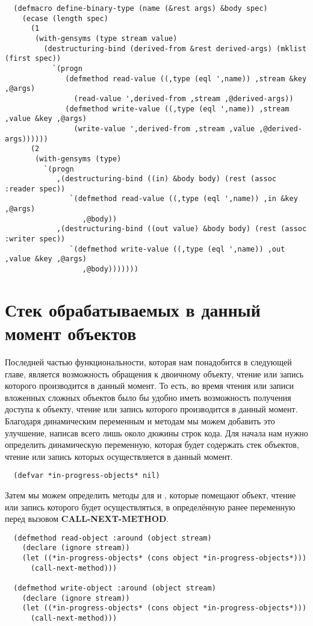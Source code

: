 \begin{lstlisting}
  (defmacro define-binary-type (name (&rest args) &body spec)
    (ecase (length spec)
      (1
       (with-gensyms (type stream value)
         (destructuring-bind (derived-from &rest derived-args) (mklist (first spec))
           `(progn
              (defmethod read-value ((,type (eql ',name)) ,stream &key ,@args)
                (read-value ',derived-from ,stream ,@derived-args))
              (defmethod write-value ((,type (eql ',name)) ,stream ,value &key ,@args)
                (write-value ',derived-from ,stream ,value ,@derived-args))))))
      (2
       (with-gensyms (type)
         `(progn
            ,(destructuring-bind ((in) &body body) (rest (assoc :reader spec))
               `(defmethod read-value ((,type (eql ',name)) ,in &key ,@args)
                  ,@body))
            ,(destructuring-bind ((out value) &body body) (rest (assoc :writer spec))
               `(defmethod write-value ((,type (eql ',name)) ,out ,value &key ,@args)
                  ,@body)))))))
\end{lstlisting}

\section{Стек обрабатываемых в данный момент объектов}

Последней частью функциональности, которая нам понадобится в следующей главе, является
возможность обращения к двоичному объекту, чтение или запись которого производится в
данный момент. То есть, во время чтения или записи вложенных сложных объектов было бы
удобно иметь возможность получения доступа к объекту, чтение или запись которого
производится в данный момент. Благодаря динамическим переменным и методам 
мы можем добавить это улучшение, написав всего лишь около дюжины строк кода. Для начала
нам нужно определить динамическую переменную, которая будет содержать стек объектов,
чтение или запись которых осуществляется в данный момент.

\begin{lstlisting}
  (defvar *in-progress-objects* nil)
\end{lstlisting}

Затем мы можем определить методы  для  и
, которые помещают объект, чтение или запись которого будет
осуществляться, в определённую ранее переменную перед вызовом \textbf{CALL-NEXT-METHOD}.

\begin{lstlisting}
  (defmethod read-object :around (object stream)
    (declare (ignore stream))
    (let ((*in-progress-objects* (cons object *in-progress-objects*)))
      (call-next-method)))

  (defmethod write-object :around (object stream)
    (declare (ignore stream))
    (let ((*in-progress-objects* (cons object *in-progress-objects*)))
      (call-next-method)))
\end{lstlisting}

